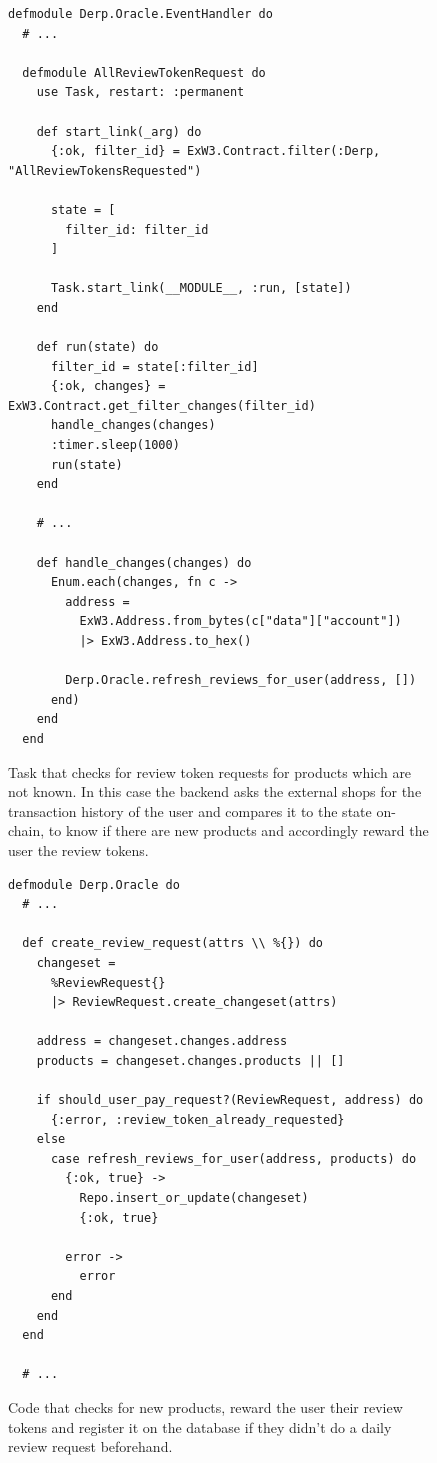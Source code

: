 \documentclass[12pt,a4paper,oneside]{article}
\theoremstyle{definition}
\begin{document}
\begin{figure}[H]
	\begin{verbatim}
defmodule Derp.Oracle.EventHandler do
  # ...

  defmodule AllReviewTokenRequest do
    use Task, restart: :permanent

    def start_link(_arg) do
      {:ok, filter_id} = ExW3.Contract.filter(:Derp, "AllReviewTokensRequested")

      state = [
        filter_id: filter_id
      ]

      Task.start_link(__MODULE__, :run, [state])
    end

    def run(state) do
      filter_id = state[:filter_id]
      {:ok, changes} = ExW3.Contract.get_filter_changes(filter_id)
      handle_changes(changes)
      :timer.sleep(1000)
      run(state)
    end

    # ...

    def handle_changes(changes) do
      Enum.each(changes, fn c ->
        address =
          ExW3.Address.from_bytes(c["data"]["account"])
          |> ExW3.Address.to_hex()

        Derp.Oracle.refresh_reviews_for_user(address, [])
      end)
    end
  end
    \end{verbatim}
	\label{code:all-review-token-request}
	\caption{Task that checks for review token requests for products which are not known. In this case the backend asks the external shops for the transaction history of the user and compares it to the state on-chain, to know if there are new products and accordingly reward the user the review tokens.}
\end{figure}

\begin{figure}[h]
	\begin{verbatim}
defmodule Derp.Oracle do
  # ...

  def create_review_request(attrs \\ %{}) do
    changeset =
      %ReviewRequest{}
      |> ReviewRequest.create_changeset(attrs)

    address = changeset.changes.address
    products = changeset.changes.products || []

    if should_user_pay_request?(ReviewRequest, address) do
      {:error, :review_token_already_requested}
    else
      case refresh_reviews_for_user(address, products) do
        {:ok, true} ->
          Repo.insert_or_update(changeset)
          {:ok, true}

        error ->
          error
      end
    end
  end
  
  # ...
    \end{verbatim}
	\label{code:create-review-request}
	\caption{Code that checks for new products, reward the user their review tokens and register it on the database if they didn't do a daily review request beforehand.}
\end{figure}
\end{document}
